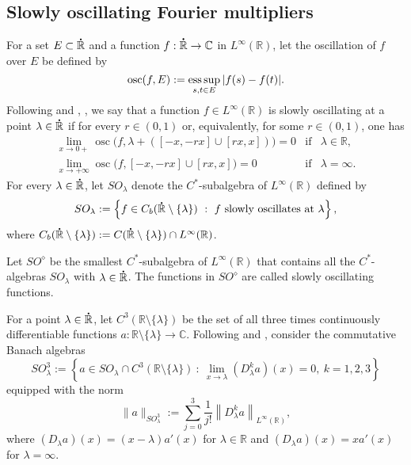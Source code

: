 \documentclass[reqno]{amsproc}
\newcommand{\dR}{{\bf\dot{\R}}}
\newcommand{\C}{\mathbb{C}}
\newcommand{\R}{\mathbb{R}}
\theoremstyle{definition}
\theoremstyle{remark}
\numberwithin{equation}{section}
\begin{document}
\subsection{Slowly oscillating Fourier multipliers}
\label{sec:SO-multipliers}
For a set $E\subset\dR$ and a function
$f:\dR\to\C$ in $L^\infty(\R)$, let the oscillation of
$f$ over $E$ be defined by
\[
\operatorname{osc}(f,E)
:=
\operatornamewithlimits{ess\,sup}_{s,t\in E}|f(s)-f(t)|.
\]
Following \cite[Section~4]{BFK06} and
\cite[Section~2.1]{KILH12}, \cite[Section~2.1]{KILH13a},
we say that a function $f\in L^\infty(\R)$ is slowly
oscillating at a point $\lambda\in\dR$ if for every $r\in(0,1)$ or,
equivalently, for some $r\in(0,1)$, one has
\[
\begin{array}{lll}
\lim\limits_{x\to 0+}
\operatorname{osc}\big(f,\lambda+([-x,-rx]\cup[rx,x])\big)=0
&\mbox{if}& \lambda\in\R,
\\
\lim\limits_{x\to +\infty}
\operatorname{osc}\big(f,[-x,-rx]\cup[rx,x]\big)=0
&\mbox{if}& \lambda=\infty.
\end{array}
\]
For every $\lambda\in\dR$, let $SO_\lambda$ denote the $C^*$-subalgebra of
$L^\infty(\R)$ defined by
\[
SO_\lambda:=\left\{f\in C_b(\dR\setminus\{\lambda\})\ :\ f
\mbox{ slowly oscillates at }\lambda\right\},
\]
where
$C_b(\dR\setminus\{\lambda\}):=C(\dR\setminus\{\lambda\})\cap L^\infty(\R)$.

Let $SO^\diamond$ be the smallest $C^*$-subalgebra of $L^\infty(\R)$ that
contains all the $C^*$-algebras $SO_\lambda$ with $\lambda\in\dR$.
The functions in $SO^\diamond$ are called slowly oscillating functions.


For a point $\lambda\in\dR$, let $C^3(\R\setminus\{\lambda\})$ be the set of
all three times continuously differentiable functions
$a:\R\setminus\{\lambda\}\to\C$.
Following \cite[Section~2.4]{KILH12} and \cite[Section~2.3]{KILH13a}, consider
the commutative Banach algebras
\[
SO_\lambda^3:=\left\{
a\in SO_\lambda\cap C^3(\R\setminus\{\lambda\})\ :\
\lim_{x\to\lambda}(D_\lambda^k a)(x)=0,
\ k=1,2,3
\right\}
\]
equipped with the norm
\[
\|a\|_{SO_\lambda^3}:=
\sum_{j=0}^3\frac{1}{j!}\left\|D_\lambda^ka\right\|_{L^\infty(\R)},
\]
where $(D_\lambda a)(x)=(x-\lambda) a'(x)$ for $\lambda\in\R$ and
$(D_\lambda a)(x)=xa'(x)$ for $\lambda=\infty$.
\end{document}
